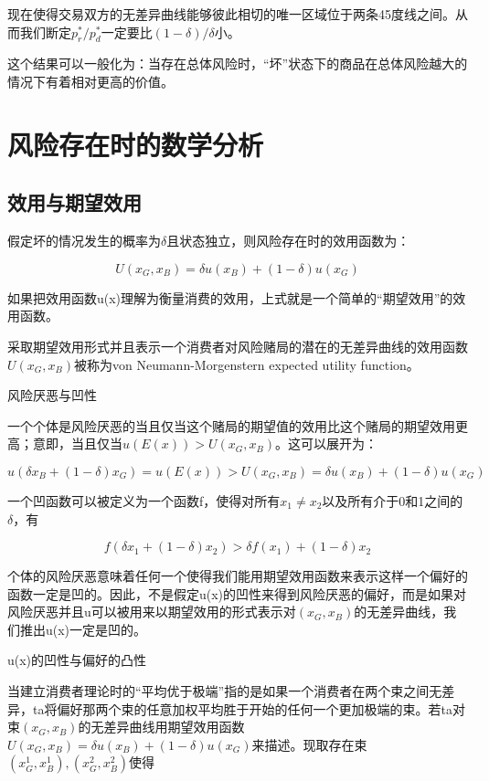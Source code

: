 \documentclass{article}
\begin{document}
现在使得交易双方的无差异曲线能够彼此相切的唯一区域位于两条45度线之间。从而我们断定$ p_r^*/p_d^* $一定要比$ (1-\delta)/\delta $小。

这个结果可以一般化为：当存在总体风险时，“坏”状态下的商品在总体风险越大的情况下有着相对更高的价值。

\section{风险存在时的数学分析}

\subsection{效用与期望效用}

假定坏的情况发生的概率为$ \delta $且状态独立，则风险存在时的效用函数为：

\[
U(x_G,x_B)=\delta u(x_B)+(1-\delta)u(x_G)
\]

如果把效用函数u(x)理解为衡量消费的效用，上式就是一个简单的“期望效用”的效用函数。

采取期望效用形式并且表示一个消费者对风险赌局的潜在的无差异曲线的效用函数$ U(x_G,x_B) $被称为von Neumann-Morgenstern expected utility
function。

\hspace*{\fill}

风险厌恶与凹性

一个个体是风险厌恶的当且仅当这个赌局的期望值的效用比这个赌局的期望效用更高；意即，当且仅当$ u(E(x))>U(x_G,x_B) $。这可以展开为：

\[
u(\delta x_B+(1-\delta)x_G)=u(E(x))>U(x_G,x_B)=\delta u(x_B)+(1-\delta)u(x_G)
\]

一个凹函数可以被定义为一个函数f，使得对所有$ x_1\ne x_2 $以及所有介于0和1之间的$ \delta $，有

\[
f(\delta x_1+(1-\delta)x_2)>\delta f(x_1)+(1-\delta)x_2
\]

个体的风险厌恶意味着任何一个使得我们能用期望效用函数来表示这样一个偏好的函数一定是凹的。因此，不是假定u(x)的凹性来得到风险厌恶的偏好，而是如果对风险厌恶并且u可以被用来以期望效用的形式表示对$ (x_G,x_B) $的无差异曲线，我们推出u(x)一定是凹的。

\hspace*{\fill}

u(x)的凹性与偏好的凸性

当建立消费者理论时的“平均优于极端”指的是如果一个消费者在两个束之间无差异，ta将偏好那两个束的任意加权平均胜于开始的任何一个更加极端的束。若ta对束$ (x_G,x_B) $的无差异曲线用期望效用函数$ U(x_G,x_B)=\delta u(x_B)+(1-\delta)u(x_G) $来描述。现取存在束$ (x_G^1,x_B^1),(x_G^2,x_B^2) $使得
\end{document}
